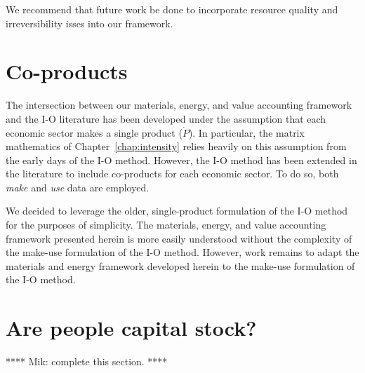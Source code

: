 We recommend that future work be done to incorporate 
resource quality and irreversibility isses 
into our framework.


\section{Co-products}
\label{sec:make-use}

The intersection between our materials, energy, and value accounting framework 
and the I-O literature has been developed under the assumption 
that each economic sector makes a single product ($\dot{P}$).
In particular, the matrix mathematics of Chapter~\ref{chap:intensity}
relies heavily on this assumption 
from the early days of the I-O method.\cite{Bullard:1978vd}
However, the I-O method has been extended 
in the literature to include
co-products for each economic sector.\cite{Costanza:1984tq,Casler1984} 
To do so, both \emph{make} and \emph{use} data are employed.

We decided to leverage the older,
single-product formulation of the I-O method
for the purposes of simplicity. 
The materials, energy, and value accounting framework
presented herein is more easily understood 
without the complexity of the make-use formulation 
of the I-O method.
However, work remains to adapt the materials and energy framework
developed herein to the make-use formulation of the I-O method.


\section{Are people capital stock?}
\label{sec:people_as_stock}

**** Mik: complete this section. ****

